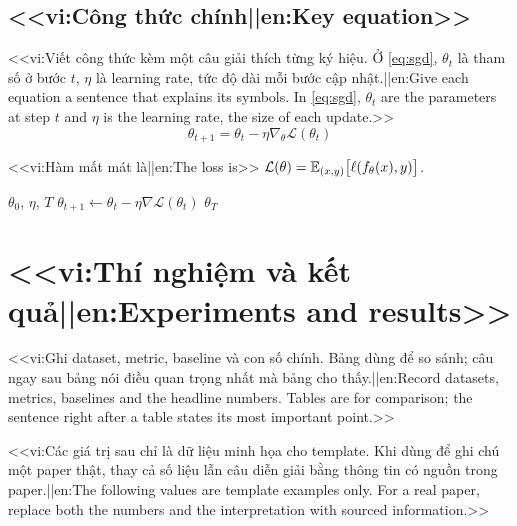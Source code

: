 \documentclass[12pt,a4paper]{article}
\begin{document}
\subsection{<<vi:Công thức chính||en:Key equation>>}
<<vi:Viết công thức kèm một câu giải thích từng ký hiệu. Ở \cref{eq:sgd}, $\theta_t$ là tham số ở bước $t$, $\eta$ là learning rate, tức độ dài mỗi bước cập nhật.||en:Give each equation a sentence that explains its symbols. In \cref{eq:sgd}, $\theta_t$ are the parameters at step $t$ and $\eta$ is the learning rate, the size of each update.>>
\begin{equation}
  \theta_{t+1} = \theta_t - \eta \nabla_\theta \mathcal{L}(\theta_t)
  \label{eq:sgd}
\end{equation}

\begin{definition}
<<vi:Hàm mất mát là||en:The loss is>> $\mathcal{L}(\theta) = \mathbb{E}_{(x,y)}\big[\ell(f_\theta(x), y)\big]$.
\end{definition}

\begin{algorithm}
  \caption{<<vi:Gradient descent||en:Gradient descent>>}
  \begin{algorithmic}[1]
    \Require $\theta_0$, $\eta$, $T$
      \State $\theta_{t+1} \gets \theta_t - \eta \nabla \mathcal{L}(\theta_t)$ 
    \EndFor
    \State \Return $\theta_T$
  \end{algorithmic}
\end{algorithm}

\section{<<vi:Thí nghiệm và kết quả||en:Experiments and results>>}
<<vi:Ghi dataset, metric, baseline và con số chính. Bảng dùng để so sánh; câu ngay sau bảng nói điều quan trọng nhất mà bảng cho thấy.||en:Record datasets, metrics, baselines and the headline numbers. Tables are for comparison; the sentence right after a table states its most important point.>>

<<vi:Các giá trị sau chỉ là dữ liệu minh họa cho template. Khi dùng để ghi chú một paper thật, thay cả số liệu lẫn câu diễn giải bằng thông tin có nguồn trong paper.||en:The following values are template examples only. For a real paper, replace both the numbers and the interpretation with sourced information.>>
\end{document}
